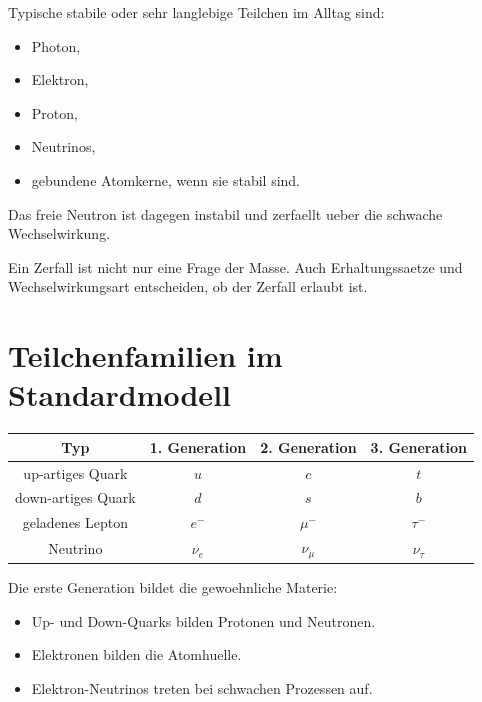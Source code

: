 \begin{notebox}
Typische stabile oder sehr langlebige Teilchen im Alltag sind:
\begin{itemize}
    \item Photon,
    \item Elektron,
    \item Proton,
    \item Neutrinos,
    \item gebundene Atomkerne, wenn sie stabil sind.
\end{itemize}
Das freie Neutron ist dagegen instabil und zerfaellt ueber die schwache Wechselwirkung.
\end{notebox}

\begin{examtipbox}
Ein Zerfall ist nicht nur eine Frage der Masse.
Auch Erhaltungssaetze und Wechselwirkungsart entscheiden, ob der Zerfall erlaubt ist.
\end{examtipbox}

\section{Teilchenfamilien im Standardmodell}

\begin{center}
\begin{tabular}{|c|c|c|c|}
\hline
Typ & 1. Generation & 2. Generation & 3. Generation \\
\hline
up-artiges Quark & $u$ & $c$ & $t$ \\
\hline
down-artiges Quark & $d$ & $s$ & $b$ \\
\hline
geladenes Lepton & $e^-$ & $\mu^-$ & $\tau^-$ \\
\hline
Neutrino & $\nu_e$ & $\nu_\mu$ & $\nu_\tau$ \\
\hline
\end{tabular}
\end{center}

\begin{conceptbox}
Die erste Generation bildet die gewoehnliche Materie:
\begin{itemize}
    \item Up- und Down-Quarks bilden Protonen und Neutronen.
    \item Elektronen bilden die Atomhuelle.
    \item Elektron-Neutrinos treten bei schwachen Prozessen auf.
\end{itemize}
\end{conceptbox}

